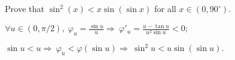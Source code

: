 \documentclass[12pt]{article}
\newenvironment{solution}[2][Solution]{\begin{trivlist}
\item[\hskip \labelsep {\bfseries #1}]}{\end{trivlist}}
\newenvironment{problem}[2][Problem]{\begin{trivlist}
\item[\hskip \labelsep {\bfseries #1}\hskip \labelsep {\bfseries #2.}]}{\end{trivlist}}
\begin{document}
\vspace{3cm}

\begin{problem}{2}
    Prove that $\sin^2(x)<x\sin(\sin x)$ for all $x\in (0,90^\circ).$
\end{problem}

\begin{solution}{2} \textbf{ }

    $ \forall u\in (0,\pi/2), \; \varphi_u=\frac {\sin u }u\Rightarrow~ \varphi'_u=\frac {u-\tan u}{u^2\sin u}<0; $

$\sin u< u\Rightarrow~\varphi_u<\varphi(\sin u)\Rightarrow~\boxed{\sin^2u<u\sin(\sin u)}.$
\end{solution}

\vspace{3cm}



\pagebreak
\end{document}
